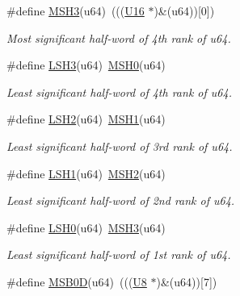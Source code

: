 \begin{DoxyCompactItemize}
\#define \mbox{\hyperlink{group__group__sam0__utils_gabb233f238b63c12d2ff361d9ddb3114b}{M\+S\+H3}}(u64)~(((\mbox{\hyperlink{group__group__sam0__utils_ga0a0a322d5fa4a546d293a77ba8b4a71f}{U16}} $\ast$)\&(u64))\mbox{[}0\mbox{]})
\begin{DoxyCompactList}\small\item\em Most significant half-\/word of 4th rank of {\itshape u64}. \end{DoxyCompactList}\item 
\#define \mbox{\hyperlink{group__group__sam0__utils_ga1ec33d340ef17c91cb0530d00ccb0ea8}{L\+S\+H3}}(u64)~\mbox{\hyperlink{group__group__sam0__utils_ga280d6a94884872f6a5be80c873e8adc1}{M\+S\+H0}}(u64)
\begin{DoxyCompactList}\small\item\em Least significant half-\/word of 4th rank of {\itshape u64}. \end{DoxyCompactList}\item 
\#define \mbox{\hyperlink{group__group__sam0__utils_ga2efccfe683ebf7d89a972fbbdea2c26d}{L\+S\+H2}}(u64)~\mbox{\hyperlink{group__group__sam0__utils_ga43de4fac62f938ff4eb448a87522ec0e}{M\+S\+H1}}(u64)
\begin{DoxyCompactList}\small\item\em Least significant half-\/word of 3rd rank of {\itshape u64}. \end{DoxyCompactList}\item 
\#define \mbox{\hyperlink{group__group__sam0__utils_gac593b0be4555d883b4297b45cffc4168}{L\+S\+H1}}(u64)~\mbox{\hyperlink{group__group__sam0__utils_ga5d32ec744212194c8106c51b89a5dfe9}{M\+S\+H2}}(u64)
\begin{DoxyCompactList}\small\item\em Least significant half-\/word of 2nd rank of {\itshape u64}. \end{DoxyCompactList}\item 
\#define \mbox{\hyperlink{group__group__sam0__utils_ga3026b9288b45a9794fd3eb585cbe10bc}{L\+S\+H0}}(u64)~\mbox{\hyperlink{group__group__sam0__utils_gabb233f238b63c12d2ff361d9ddb3114b}{M\+S\+H3}}(u64)
\begin{DoxyCompactList}\small\item\em Least significant half-\/word of 1st rank of {\itshape u64}. \end{DoxyCompactList}\item 
\#define \mbox{\hyperlink{group__group__sam0__utils_ga5f24ecf381776ee415991a545a05e4c7}{M\+S\+B0D}}(u64)~(((\mbox{\hyperlink{group__group__sam0__utils_gaa63ef7b996d5487ce35a5a66601f3e73}{U8}}  $\ast$)\&(u64))\mbox{[}7\mbox{]})

\end{DoxyCompactItemize}
